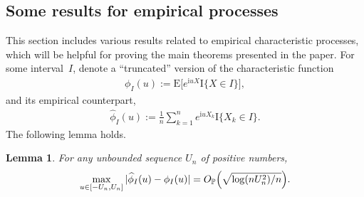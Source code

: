 \documentclass[numbers,webpdf,imaiai]{ima-authoring-template}%
\theoremstyle{thmstyletwo}%
\newtheorem{lemma}{Lemma}%
\newcommand{\E}{\mathrm{E}}
\newcommand{\I}{{\mathrm{I}}}
\renewcommand{\i}{\mathrm{i}}
\renewcommand{\P}{\mathbb{P}}
\numberwithin{equation}{section}
\begin{document}
\subsection{Some results for empirical processes}
This section includes various results related to empirical characteristic processes, which will be helpful for proving the main theorems presented in the paper. For some interval~\(I\), denote a ``truncated'' version of the characteristic function 
\begin{align}\label{not1}
\phi_I(u) := \E\bigl[
e^{\i u X} \I\{X \in I\}
\bigr],
\end{align}
and its empirical counterpart, 
\begin{align}\label{not2}
\widehat\phi_I(u) := \frac{1}{n}\sum_{k=1}^n
e^{\i u X_k} \I\{X_k \in I\}.
\end{align}
The following lemma holds.
\begin{lemma}\label{our_lemma1}
For any unbounded sequence $U_n$ of positive numbers,\begin{align*}
      \max_{u \in [-U_n, U_n]}  |\widehat\phi_I(u) - \phi_I(u)| = O_{\P} \Bigl( 
        \sqrt{
\log(nU_n^2) / n
}
        \Bigr).
    \end{align*}
 \end{lemma}
\end{document}
